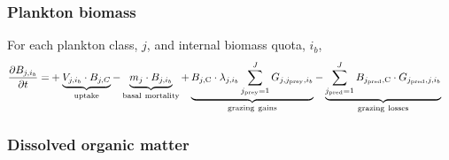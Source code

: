 \documentclass[gmd, manuscript]{copernicus}
\begin{document}
{\subsubsection{Plankton biomass}

For each plankton class, $j$, and internal biomass quota, $i_b$,
%
\begin{align}
\frac{\partial B_{j,i_b}}{\partial t} = &+ \underbrace{V_{j,i_b} \cdot B_{j,C}}_{\rm uptake} 
 - \underbrace{m_{j} \cdot B_{j,i_b}}_{\rm basal~mortality} + \underbrace{B_{j,{\rm C}} \cdot \lambda_{j,i_b} \sum_{j_{\rm prey}=1}^{J}G_{j,j_{\rm prey},i_b} }_{\rm grazing~gains} 
 - \underbrace{ \sum_{j_{\rm pred}=1}^{J} B_{j_{\rm pred},{\rm C}} \cdot G_{j_{\rm pred},j,i_b} }_{\rm grazing~losses} \label{dBdt}
\end{align}
%
\subsubsection{Dissolved organic matter}

}
\end{document}
